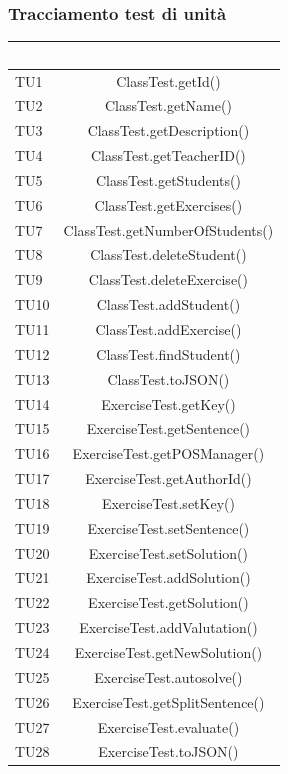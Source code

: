 \subsubsection{Tracciamento test di unità}
\begin{longtable}{|>{\centering\arraybackslash}m{1.6cm}|c|}		
 	\rowcolor{LightBlue}
		\textbf{\textcolor{white}{Test}}
		& \textbf{\textcolor{white}{Metodo}}\\ \hline
		TU1 & ClassTest.getId()\\ \hline
		TU2 & ClassTest.getName()\\ \hline
		TU3 & ClassTest.getDescription()\\ \hline
		TU4 & ClassTest.getTeacherID()\\ \hline
		TU5 & ClassTest.getStudents()\\ \hline
		TU6 & ClassTest.getExercises()\\ \hline
		TU7 & ClassTest.getNumberOfStudents()\\ \hline
		TU8 & ClassTest.deleteStudent()\\ \hline
		TU9 & ClassTest.deleteExercise()\\ \hline
		TU10 & ClassTest.addStudent()\\ \hline
		TU11 & ClassTest.addExercise()\\ \hline
		TU12 & ClassTest.findStudent()\\ \hline
		TU13 & ClassTest.toJSON()\\ \hline
		
		TU14 & ExerciseTest.getKey()\\ \hline
		TU15 & ExerciseTest.getSentence()\\ \hline
		TU16 & ExerciseTest.getPOSManager()\\ \hline
		TU17 & ExerciseTest.getAuthorId()\\ \hline
		TU18 & ExerciseTest.setKey()\\ \hline
		TU19 & ExerciseTest.setSentence()\\ \hline
		TU20 & ExerciseTest.setSolution()\\ \hline
		TU21 & ExerciseTest.addSolution()\\ \hline
		TU22 & ExerciseTest.getSolution()\\ \hline
		TU23 & ExerciseTest.addValutation()\\ \hline
		TU24 & ExerciseTest.getNewSolution()\\ \hline
		TU25 & ExerciseTest.autosolve()\\ \hline
		TU26 & ExerciseTest.getSplitSentence()\\ \hline
		TU27 & ExerciseTest.evaluate()\\ \hline
		TU28 & ExerciseTest.toJSON()\\ \hline
		

\end{longtable}
